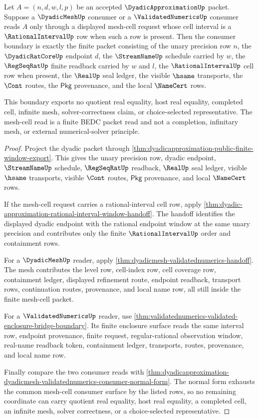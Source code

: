 \begin{theorem}
\label{thm:dyadicapproximation-mesh-cell-consumer-boundary}
Let $A=(n,d,w,l,p)$ be an accepted $\DyadicApproximationUp$ packet. Suppose a
$\DyadicMeshUp$ consumer or a $\ValidatedNumericsUp$ consumer reads $A$ only
through a displayed mesh-cell request whose cell interval is a
$\RationalIntervalUp$ row when such a row is present. Then the consumer boundary
is exactly the finite packet consisting of the unary precision row $n$, the
$\DyadicRatCoreUp$ endpoint $d$, the $\StreamNameUp$ schedule carried by $w$,
the $\RegSeqRatUp$ finite readback carried by $w$ and $l$, the
$\RationalIntervalUp$ cell row when present, the $\RealUp$ seal ledger, the
visible $\hsame$ transports, the $\Cont$ routes, the $\mathsf{Pkg}$
provenance, and the local $\NameCert$ rows.

This boundary exports no quotient real equality, host real equality, completed
cell, infinite mesh, solver-correctness claim, or choice-selected
representative. The mesh-cell read is a finite BEDC packet read and not a
completion, infinitary mesh, or external numerical-solver principle.
\end{theorem}
\begin{proof}
Project the dyadic packet through
\autoref{thm:dyadicapproximation-public-finite-window-export}. This gives the
unary precision row, dyadic endpoint, $\StreamNameUp$ schedule,
$\RegSeqRatUp$ readback, $\RealUp$ seal ledger, visible $\hsame$ transports,
visible $\Cont$ routes, $\mathsf{Pkg}$ provenance, and local $\NameCert$ rows.

If the mesh-cell request carries a rational-interval cell row, apply
\autoref{thm:dyadic-approximation-rational-interval-window-handoff}. The
handoff identifies the displayed dyadic endpoint with the rational endpoint
window at the same unary precision and contributes only the finite
$\RationalIntervalUp$ order and containment rows.

For a $\DyadicMeshUp$ reader, apply
\autoref{thm:dyadicmesh-validatednumerics-handoff}. The mesh contributes the
level row, cell-index row, cell coverage row, containment ledger, displayed
refinement route, endpoint readback, transport rows, continuation routes,
provenance, and local name row, all still inside the finite mesh-cell packet.

For a $\ValidatedNumericsUp$ reader, use
\autoref{thm:validatednumerics-validated-enclosure-bridge-boundary}. Its
finite enclosure surface reads the same interval row, endpoint provenance,
finite request, regular-rational observation window, real-name readback token,
containment ledger, transports, routes, provenance, and local name row.

Finally compare the two consumer reads with
\autoref{thm:dyadicapproximation-dyadicmesh-validatednumerics-consumer-normal-form}.
The normal form exhausts the common mesh-cell consumer surface by the listed
rows, so no remaining coordinate can carry quotient real equality, host real
equality, a completed cell, an infinite mesh, solver correctness, or a
choice-selected representative.
\end{proof}
